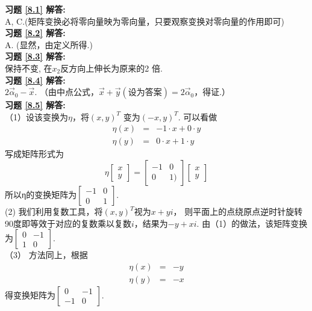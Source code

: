 \textbf{习题 \ref{8.1} 解答:}\\
A, C.(矩阵变换必将零向量映为零向量，只要观察变换对零向量的作用即可)\\
\textbf{习题 \ref{8.2} 解答:}\\
A. (显然，由定义所得.)\\
\textbf{习题 \ref{8.3} 解答:}\\
保持不变, 在$x_2$反方向上伸长为原来的2 倍.\\
\textbf{习题 \ref{8.4} 解答:}\\
$2\vec{\alpha}_0-\vec{x}$. （由中点公式，$\vec{x}+\vec{y}(\text{设为答案})=2\vec{\alpha}_0$，得证.）\\
\textbf{习题 \ref{8.5} 解答:}\\
（1）设该变换为$\eta$，将$(x,y)^T$ 变为$(-x,y)^T$. 可以看做
\begin{eqnarray*}
    \eta(x) &=& -1\cdot x+0\cdot y \\
    \eta(y) &=& 0\cdot x+1\cdot y
\end{eqnarray*}
写成矩阵形式为
\begin{equation*}
\eta\begin{bmatrix}x\\y\end{bmatrix}=
\begin{bmatrix}-1&0\\0&1)\end{bmatrix}
\begin{bmatrix}x\\y\end{bmatrix}
\end{equation*}
所以η的变换矩阵为$\begin{bmatrix}-1&0\\0&1\end{bmatrix}$.\\
(2) 我们利用复数工具，将$(x,y)^T$视为$x+yi$，
则平面上的点绕原点逆时针旋转90度即等效于对应的复数乘以复数$i$，结果为$-y+xi$.
由（1）的做法，该矩阵变换为$\begin{bmatrix}0&-1\\1&0\end{bmatrix}$.\\
（3） 方法同上，根据
\begin{eqnarray*}
    \eta(x) &=& - y \\
    \eta(y) &=& - x
\end{eqnarray*}
得变换矩阵为$\begin{bmatrix}0&-1\\-1&0\end{bmatrix}$.\\
